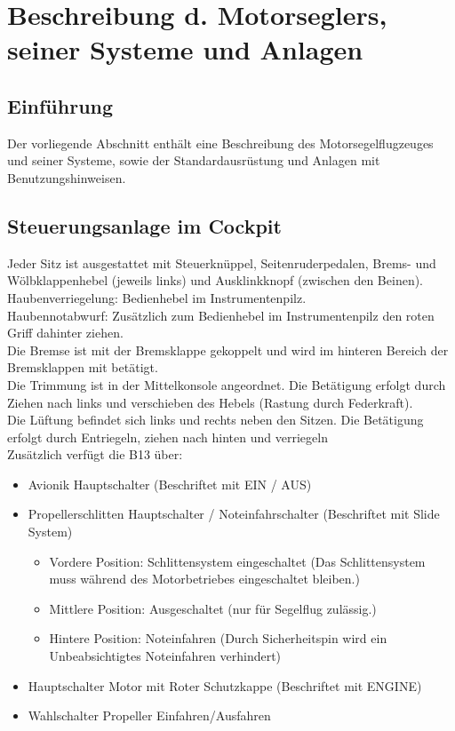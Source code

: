 \chapter{ Beschreibung d. Motorseglers, seiner Systeme und Anlagen}

\section{Einführung}
Der vorliegende Abschnitt enthält eine Beschreibung des Motorsegelflugzeuges und seiner Systeme, sowie der Standardausrüstung und Anlagen mit Benutzungshinweisen. 

\section{Steuerungsanlage im Cockpit}
Jeder Sitz ist ausgestattet mit Steuerknüppel, Seitenruderpedalen, Brems- und Wölbklappenhebel (jeweils links) und Ausklinkknopf (zwischen den Beinen).\\
Haubenverriegelung: Bedienhebel im Instrumentenpilz.\\
Haubennotabwurf: Zusätzlich zum Bedienhebel im Instrumentenpilz den roten Griff dahinter ziehen.\\
Die Bremse ist mit der Bremsklappe gekoppelt und wird im hinteren Bereich der Bremsklappen mit betätigt.\\
Die Trimmung ist in der Mittelkonsole angeordnet. Die Betätigung erfolgt durch Ziehen nach links und verschieben des Hebels (Rastung durch Federkraft).\\
Die Lüftung befindet sich links und rechts neben den Sitzen. Die Betätigung erfolgt durch Entriegeln,  ziehen nach hinten und verriegeln\\

Zusätzlich verfügt die B13 über:

\begin{itemize}
\item Avionik Hauptschalter (Beschriftet mit EIN / AUS)
\item Propellerschlitten Hauptschalter / Noteinfahrschalter (Beschriftet mit Slide System)
\begin{itemize}
\item Vordere Position: Schlittensystem eingeschaltet (Das Schlittensystem muss während des Motorbetriebes eingeschaltet bleiben.)
\item Mittlere Position: Ausgeschaltet (nur für Segelflug zulässig.)
\item Hintere Position: Noteinfahren (Durch Sicherheitspin wird ein Unbeabsichtigtes Noteinfahren verhindert)
\end{itemize}
\item Hauptschalter Motor mit Roter Schutzkappe (Beschriftet mit ENGINE)
\item Wahlschalter Propeller Einfahren/Ausfahren
\end{itemize}


